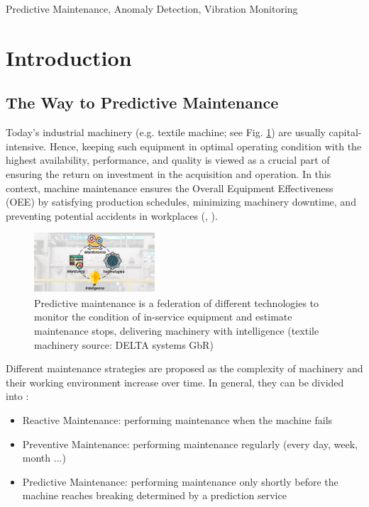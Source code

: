\documentclass[conference]{IEEEtran}
\begin{document}
\begin{IEEEkeywords}
Predictive Maintenance, Anomaly Detection, Vibration Monitoring
\end{IEEEkeywords}

\section{Introduction}

\subsection{The Way to Predictive Maintenance}

Today’s industrial machinery (e.g. textile machine; see Fig. \ref{fig_machine}) are usually capital-intensive. Hence, keeping such equipment in optimal operating condition with the highest availability, performance, and quality is viewed as a crucial part of ensuring the return on investment in the acquisition and operation. In this context, machine maintenance ensures the Overall Equipment Effectiveness (OEE) by satisfying production schedules, minimizing machinery downtime, and preventing potential accidents in workplaces (\cite{chong2015}, \cite{b1}). 

\begin{figure}[htbp]
\centering
\includegraphics[width=0.4\textwidth]{graphics/predictive_maintenance.pdf}
\caption{Predictive maintenance is a federation of different technologies to monitor the condition of in-service equipment and estimate maintenance stops, delivering machinery with intelligence (textile machinery source: DELTA systems GbR)}
\label{fig_machine}
\end{figure}

Different maintenance strategies are proposed as the complexity of machinery and their working environment increase over time. In general, they can be divided into \cite{b1}:

\begin{itemize}
	\item Reactive Maintenance: performing maintenance when the machine fails
	\item Preventive Maintenance: performing maintenance regularly (every day, week, month ...)
	\item Predictive Maintenance: performing maintenance only shortly before the machine reaches breaking determined by a prediction service
\end{itemize}
\end{document}
